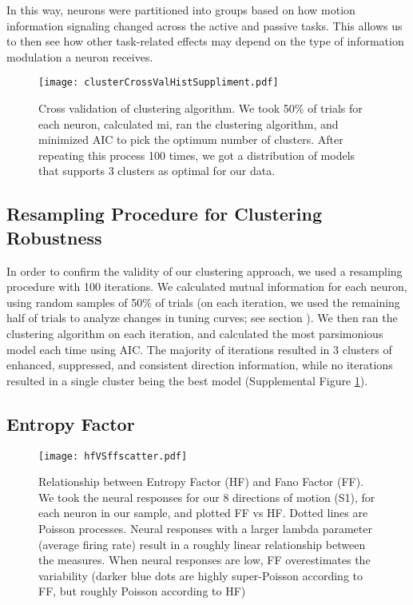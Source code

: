 In this way, neurons were partitioned into groups based on how motion information signaling changed across the active and passive tasks. This allows us to then see how other task-related effects may depend on the type of information modulation a neuron receives.


	\begin{figure}
		\centering
		\texttt{[image: clusterCrossValHistSuppliment.pdf]}
		\caption{Cross validation of clustering algorithm. We took 50\% of trials for each neuron, calculated \gls{mi}, ran the clustering algorithm, and minimized AIC to pick the optimum number of clusters. After repeating this process 100 times, we got a distribution of models that supports 3 clusters as optimal for our data.}
		\label{fig:suppXval} %
	\end{figure}



\subsection*{Resampling Procedure for Clustering Robustness}\label{sec:resampling}
\newcommand{\revXval}{ %
	In order to confirm the validity of our clustering approach, we used a resampling procedure with 100 iterations. We calculated mutual information for each neuron, using random samples of 50\% of trials (on each iteration, we used the remaining half of trials to analyze changes in tuning curves; see section \emph{\nameref{sec:tuning}}). We then ran the clustering algorithm on each iteration, and calculated the most parsimonious model each time using AIC. The majority of iterations resulted in 3 clusters of enhanced, suppressed, and consistent direction information, while no iterations resulted in a single cluster being the best model (Supplemental Figure \ref{fig:suppXval}).
}\revXval\label{rev:xVal1}

\subsection*{Entropy Factor} 


	\begin{figure}
		\centering
		\texttt{[image: hfVSffscatter.pdf]}
		\caption{Relationship between Entropy Factor (HF) and Fano Factor (FF). We took the neural responses for our 8 directions of motion (S1), for each neuron in our sample, and plotted FF vs HF. Dotted lines are Poisson processes. Neural responses with a larger lambda parameter (average firing rate) result in a roughly linear relationship between the measures. When neural responses are low, FF overestimates the variability (darker blue dots are highly super-Poisson according to FF, but roughly Poisson according to HF)}
		\label{fig:suppFano} %
	\end{figure}


